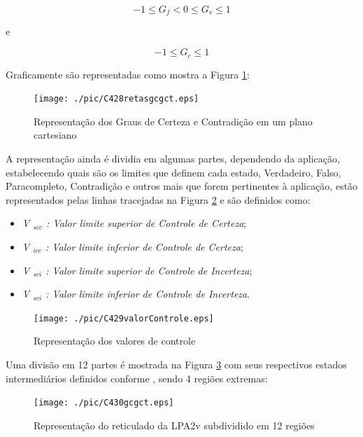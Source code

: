 \begin{center}
\begin{equation}
-1 \le G _{f}  <  0 \le G _{v} \le 1
\label{eq:grauVerdadeFalsidade}
\end{equation}
\end{center}
e
\begin{center}
\begin{equation}
-1 \le G _{c} \le 1
\label{eq:grauCertezaIntervalo}
\end{equation}
\end{center}


Graficamente são representadas como mostra a Figura \ref{fig:retasgcgct}:

\begin{figure}[!htb]
\center\texttt{[image: ./pic/C428retasgcgct.eps]}
\caption{Representação dos Graus de Certeza e Contradição em um plano cartesiano}
\label{fig:retasgcgct}
\end{figure}

A representação ainda é dividia em algumas partes, dependendo da aplicação, estabelecendo quais são os limites que definem cada estado, Verdadeiro, Falso, Paracompleto, Contradição e outros mais que forem pertinentes à aplicação, estão representados pelas linhas tracejadas na Figura \ref{fig:valorControle} e são definidos como:

\begin{itemize}
\item \emph{V $_{scc}$ : Valor limite superior de Controle de Certeza};
\item \emph{V $_{icc}$ : Valor limite inferior de Controle de Certeza};
\item \emph{V $_{sci}$ : Valor limite superior de Controle de Incerteza};
\item \emph{V $_{sci}$ : Valor limite inferior de Controle de Incerteza}.

\end{itemize}

\begin{figure}[!htb]
\center\texttt{[image: ./pic/C429valorControle.eps]}
\caption{Representação dos valores de controle}
\label{fig:valorControle}
\end{figure}

Uma divisão em 12 partes é mostrada na Figura \ref{fig:reticuladoLPA2v} com seus respectivos estados intermediários definidos conforme \cite{JoaoInacio}, sendo 4 regiões extremas:


\begin{figure}[!htb]
\center\texttt{[image: ./pic/C430gcgct.eps]}
\caption{Representação do reticulado da LPA2v subdividido em 12 regiões}
\label{fig:reticuladoLPA2v}
\end{figure}


